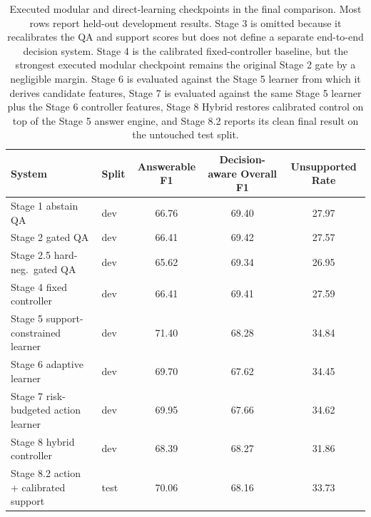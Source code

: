 \begin{table}[t]
  \centering
  \caption{Executed modular and direct-learning checkpoints in the final
  comparison.
  Most rows report held-out development results.
  Stage 3 is omitted because it recalibrates the QA and support scores but does
  not define a separate end-to-end decision system.
  Stage 4 is the calibrated fixed-controller baseline, but the strongest
  executed modular checkpoint remains the original Stage 2 gate by a negligible
  margin.
  Stage 6 is evaluated against the Stage 5 learner from which it derives
  candidate features, Stage 7 is evaluated against the same Stage 5 learner
  plus the Stage 6 controller features, Stage 8 Hybrid restores calibrated
  control on top of the Stage 5 answer engine, and Stage 8.2 reports its clean
  final result on the untouched test split.}
  \label{tab:stage5-stage6-results}
  \small
  \setlength{\tabcolsep}{8pt}
  \renewcommand{\arraystretch}{1.1}
  \begin{tabular}{@{}llccc@{}}
    \toprule
    System & Split & Answerable F1 & Decision-aware Overall F1 & Unsupported Rate \\
    \midrule
    Stage 1 abstain QA & dev & 66.76 & 69.40 & 27.97 \\
    Stage 2 gated QA & dev & 66.41 & 69.42 & 27.57 \\
    Stage 2.5 hard-neg.\ gated QA & dev & 65.62 & 69.34 & 26.95 \\
    Stage 4 fixed controller & dev & 66.41 & 69.41 & 27.59 \\
    Stage 5 support-constrained learner & dev & 71.40 & 68.28 & 34.84 \\
    Stage 6 adaptive learner & dev & 69.70 & 67.62 & 34.45 \\
    Stage 7 risk-budgeted action learner & dev & 69.95 & 67.66 & 34.62 \\
    Stage 8 hybrid controller & dev & 68.39 & 68.27 & 31.86 \\
    Stage 8.2 action + calibrated support & test & 70.06 & 68.16 & 33.73 \\
    \bottomrule
  \end{tabular}
\end{table}

